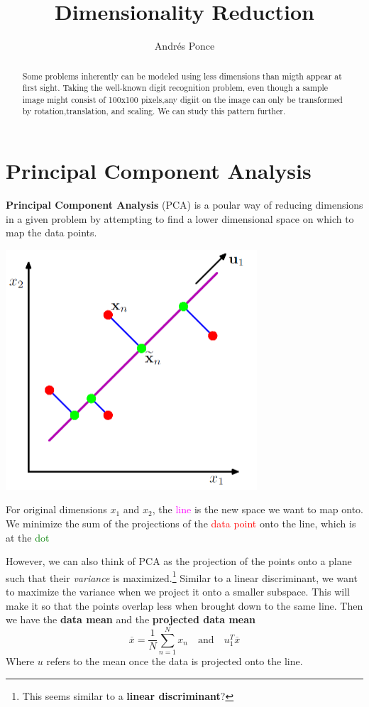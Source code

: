 \documentclass{tufte-handout}
\title{Dimensionality Reduction}
\author{Andr\'es Ponce}
\begin{document}
\maketitle
\begin{abstract}
Some problems inherently can be modeled using less dimensions
than migth appear at first sight. Taking the well-known digit
recognition problem, even though a sample image might consist of 
100x100 pixels,any digiit on the image can only be transformed by 
rotation,translation, and scaling. We can study this pattern further.
\end{abstract}
\section{Principal Component Analysis}
\textbf{Principal Component Analysis} (PCA) is a poular way of reducing 
dimensions in a given problem by attempting to find a lower dimensional
space on which to map the data points.

\begin{marginfigure}
	\includegraphics[scale=0.4]{pca}	
	\caption{For original dimensions $x_{1}$ and $x_{2}$,  the \textcolor{magenta}{line}
		is the new space we want to map onto. We minimize the sum of the projections of the 
		\textcolor{red}{data point} onto the line, which is at the \textcolor{green}{dot}}
\end{marginfigure}

However, we can also think of PCA as the projection of the points onto a plane such that their
\textit{variance} is maximized.\footnote{This seems similar to a \textbf{linear discriminant}?}
Similar to a linear discriminant, we want to maximize the variance when we project it onto a 
smaller subspace. This will make it so that the points overlap less when brought down to the same line.
Then we have the \textbf{data mean} and the \textbf{projected data mean}
\begin{equation}
\overline{x} = \frac{1}{N}\sum_{n=1}^{N}x_{n}\quad\mathrm{and}\quad u_{1}^{T}\overline{x}
\end{equation}
Where $u$ refers to the mean once the data is projected onto the line.
\end{document}
